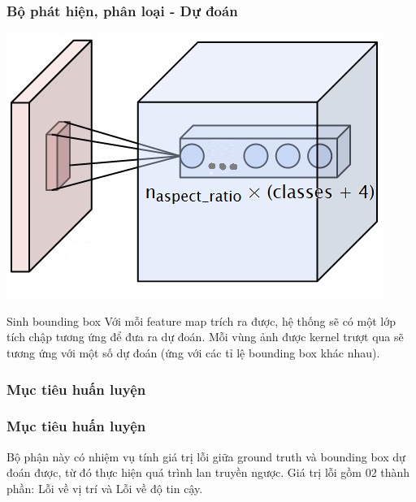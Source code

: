 \documentclass{beamer}
\begin{document}
	\begin{frame}
		\frametitle{Bộ phát hiện, phân loại - Dự đoán}
		
		\begin{center}
			\centering
			\includegraphics[width=0.5\linewidth]{depthcol.png}
			\vspace{0.3cm}
		\end{center}
		
		\begin{block}{Sinh bounding box}
			Với mỗi feature map trích ra được, hệ thống sẽ có một lớp tích chập tương ứng để đưa ra dự đoán. Mỗi vùng ảnh được kernel trượt qua sẽ tương ứng với một số dự đoán (ứng với các tỉ lệ bounding box khác nhau).
		\end{block}
		
		
	\end{frame}
	
	
	
	
	
	
	\subsubsection{Mục tiêu huấn luyện}
	\begin{frame}
		\frametitle{Mục tiêu huấn luyện}
		Bộ phận này có nhiệm vụ tính giá trị lỗi giữa ground truth và bounding box dự đoán được, từ đó thực hiện quá trình lan truyền ngược. Giá trị lỗi gồm 02 thành phần: Lỗi về vị trí và Lỗi về độ tin cậy.
		
		
		
		
		
		
	\end{frame}
	
\end{document}
